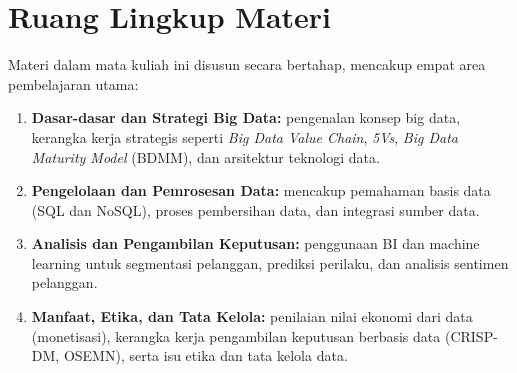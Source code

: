 \section{Ruang Lingkup Materi}

Materi dalam mata kuliah ini disusun secara bertahap, mencakup empat area pembelajaran utama:

\begin{enumerate}
	\item \textbf{Dasar-dasar dan Strategi Big Data:} pengenalan konsep big data, kerangka kerja strategis seperti \textit{Big Data Value Chain}, \textit{5Vs}, \textit{Big Data Maturity Model} (BDMM), dan arsitektur teknologi data.
	
	\item \textbf{Pengelolaan dan Pemrosesan Data:} mencakup pemahaman basis data (SQL dan NoSQL), proses pembersihan data, dan integrasi sumber data.
	
	\item \textbf{Analisis dan Pengambilan Keputusan:} penggunaan BI dan machine learning untuk segmentasi pelanggan, prediksi perilaku, dan analisis sentimen pelanggan.
	
	\item \textbf{Manfaat, Etika, dan Tata Kelola:} penilaian nilai ekonomi dari data (monetisasi), kerangka kerja pengambilan keputusan berbasis data (CRISP-DM, OSEMN), serta isu etika dan tata kelola data.
\end{enumerate}


